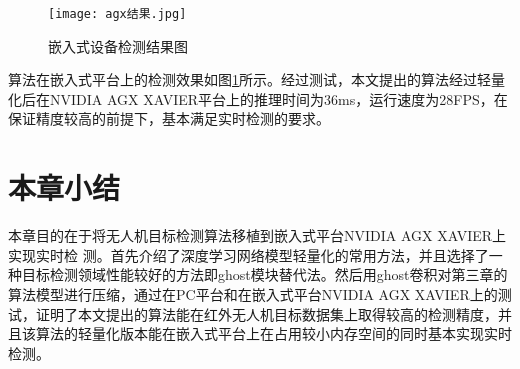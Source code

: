\begin{figure}[htbp]
    \centering
    \texttt{[image: agx结果.jpg]}
    \caption{嵌入式设备检测结果图}
    \label{agxo}
\end{figure}

算法在嵌入式平台上的检测效果如图\ref{agxo}所示。经过测试，本文提出的算法经过轻量化后在NVIDIA AGX XAVIER平台上的推理时间为36ms，运行速度为28FPS，在保证精度较高的前提下，基本满足实时检测的要求。

\section{本章小结}
本章目的在于将无人机目标检测算法移植到嵌入式平台NVIDIA AGX XAVIER上实现实时检
测。首先介绍了深度学习网络模型轻量化的常用方法，并且选择了一种目标检测领域性能较好的方法即ghost模块替代法。然后用ghost卷积对第三章的算法模型进行压缩，通过在PC平台和在嵌入式平台NVIDIA AGX XAVIER上的测试，证明了本文提出的算法能在红外无人机目标数据集上取得较高的检测精度，并且该算法的轻量化版本能在嵌入式平台上在占用较小内存空间的同时基本实现实时检测。

